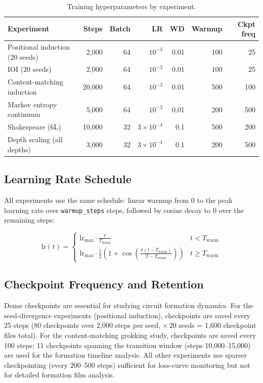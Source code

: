 \begin{table}[h]
\centering
\caption{Training hyperparameters by experiment.}
\label{tab:hyperparams}
\begin{tabular}{lrrrrrr}
\toprule
Experiment & Steps & Batch & LR & WD & Warmup & Ckpt freq \\
\midrule
Positional induction (20 seeds) & 2,000 & 64 & $10^{-3}$ & 0.01 & 100 & 25 \\
IOI (20 seeds) & 2,000 & 64 & $10^{-3}$ & 0.01 & 100 & 25 \\
Content-matching induction & 20,000 & 64 & $10^{-3}$ & 0.01 & 500 & 100 \\
Markov entropy continuum & 5,000 & 64 & $10^{-3}$ & 0.01 & 200 & 500 \\
Shakespeare (6L) & 10,000 & 32 & $3\times10^{-4}$ & 0.1 & 500 & 200 \\
Depth scaling (all depths) & 3,000 & 32 & $3\times10^{-4}$ & 0.1 & 200 & 500 \\
\bottomrule
\end{tabular}
\end{table}

\subsection{Learning Rate Schedule}

All experiments use the same schedule: linear warmup from 0 to the peak learning rate over
\texttt{warmup\_steps} steps, followed by cosine decay to 0 over the remaining steps:

\begin{equation}
\text{lr}(t) = \begin{cases}
\text{lr}_{\text{max}} \cdot \frac{t}{T_{\text{warm}}} & t < T_{\text{warm}} \\[4pt]
\text{lr}_{\text{max}} \cdot \frac{1}{2}\!\left(1 + \cos\!\left(\frac{\pi(t - T_{\text{warm}})}{T - T_{\text{warm}}}\right)\right) & t \geq T_{\text{warm}}
\end{cases}
\end{equation}

\subsection{Checkpoint Frequency and Retention}

Dense checkpoints are essential for studying circuit formation dynamics. For the seed-divergence
experiments (positional induction), checkpoints are saved every 25 steps (80 checkpoints over
2,000 steps per seed, $\times$\,20 seeds = 1,600 checkpoint files total). For the content-matching
grokking study, checkpoints are saved every 100 steps; 11 checkpoints spanning the transition window
(steps 10,000--15,000) are used for the formation timeline analysis. All other experiments use
sparser checkpointing (every 200--500 steps) sufficient for loss-curve monitoring but not for
detailed formation film analysis.

